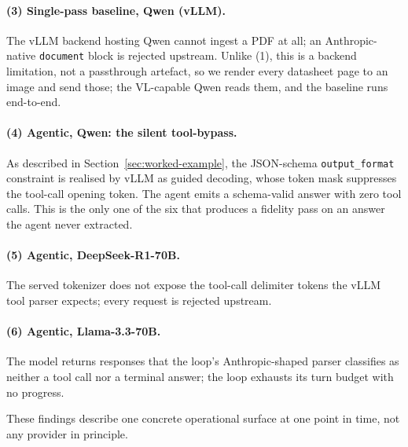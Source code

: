 \documentclass[11pt]{article}
\begin{document}
\paragraph{(3) Single-pass baseline, Qwen (vLLM).}
The vLLM backend hosting Qwen cannot ingest a PDF at all; an
Anthropic-native \texttt{document} block is rejected upstream. Unlike
(1), this is a backend limitation, not a passthrough artefact, so we
render every datasheet page to an image and send those; the VL-capable
Qwen reads them, and the baseline runs end-to-end.

\paragraph{(4) Agentic, Qwen: the silent tool-bypass.}
As described in Section~\ref{sec:worked-example}, the JSON-schema
\texttt{output\_format} constraint is realised by vLLM as guided
decoding, whose token mask suppresses the tool-call opening token. The
agent emits a schema-valid answer with zero tool calls. This is the only
one of the six that produces a fidelity pass on an answer the agent
never extracted.

\paragraph{(5) Agentic, DeepSeek-R1-70B.}
The served tokenizer does not expose the tool-call delimiter tokens the
vLLM tool parser expects; every request is rejected upstream.

\paragraph{(6) Agentic, Llama-3.3-70B.}
The model returns responses that the loop's Anthropic-shaped parser
classifies as neither a tool call nor a terminal answer; the loop
exhausts its turn budget with no progress.

These findings describe one concrete operational surface at one point
in time, not any provider in principle.
\end{document}
